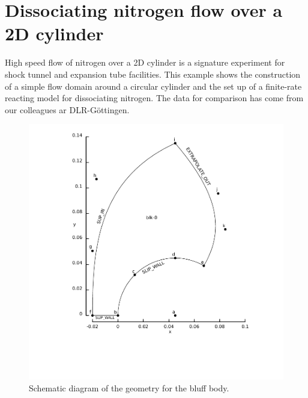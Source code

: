 
\section{Dissociating nitrogen flow over a 2D cylinder}
\label{sec:n90}
%
High speed flow of nitrogen over a 2D cylinder is a signature experiment for shock tunnel
and expansion tube facilities.
This example shows the construction of a simple flow domain around a circular cylinder
and the set up of a finite-rate reacting model for dissociating nitrogen.
The data for comparison has come from our colleagues ar DLR-G\"{o}ttingen.

\begin{figure}[htbp]
\begin{center}
\includegraphics[width=12cm,viewport=76 80 391 439,clip=true]{../2D/n90/n90-schematic.pdf}
\end{center}
\caption{Schematic diagram of the geometry for the bluff body.}
\label{n90-geometry-fig}
\end{figure}

